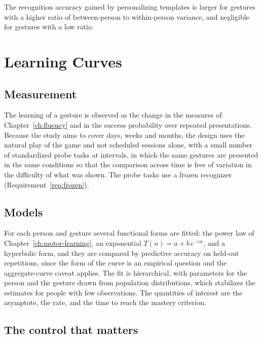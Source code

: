 \begin{hypothesis}\label{hyp:variation}
The recognition accuracy gained by personalizing templates is larger for gestures with a higher ratio of between-person to within-person variance, and negligible for gestures with a low ratio.\evH
\end{hypothesis}

\chapter{Learning Curves}\label{ch:learning-curves}

\section{Measurement}

The learning of a gesture is observed as the change in the measures of Chapter~\ref{ch:fluency} and in the success probability over repeated presentations. Because the study aims to cover days, weeks and months, the design uses the natural play of the game and not scheduled sessions alone, with a small number of standardized probe tasks at intervals, in which the same gestures are presented in the same conditions so that the comparison across time is free of variation in the difficulty of what was shown. The probe tasks use a frozen recognizer (Requirement~\ref{req:frozen}).

\section{Models}

For each person and gesture several functional forms are fitted: the power law of Chapter~\ref{ch:motor-learning}, an exponential $T(n)=a+b\,e^{-cn}$, and a hyperbolic form, and they are compared by predictive accuracy on held-out repetitions, since the form of the curve is an empirical question and the aggregate-curve caveat applies. The fit is hierarchical, with parameters for the person and the gesture drawn from population distributions, which stabilizes the estimates for people with few observations. The quantities of interest are the asymptote, the rate, and the time to reach the mastery criterion.

\section{The control that matters}

